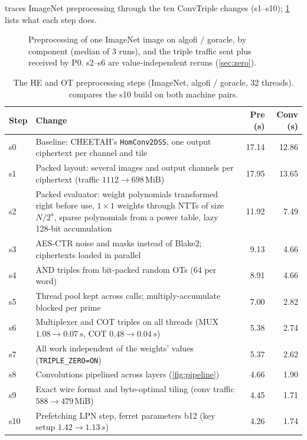 \documentclass[10pt,a4paper]{article}
\newcommand{\flag}[1]{\nolinkurl{#1}}
\newcommand{\s}{\,s\xspace}
\begin{document}
 traces ImageNet preprocessing through the ten ConvTriple changes (s1--s10); \cref{tab:steps} lists what each step does.

\begin{figure}[t]
  \centering
  \caption{Preprocessing of one ImageNet image on algofi / goracle, by component (median of 3 runs), and
  the triple traffic sent plus received by P0. s2--s6 are value-independent reruns (\cref{sec:zero}).}
  \label{fig:steps}
\end{figure}

\begin{table}[t]
\centering\small
\begin{tabularx}{\linewidth}{@{}lXrr@{}}
\toprule
Step & Change & Pre (s) & Conv (s)\\
\midrule
s0 & Baseline: CHEETAH's \texttt{HomConv2DSS}, one output ciphertext per channel and tile & 17.14 & 12.86\\
s1 & Packed layout: several images and output channels per ciphertext (traffic $1112\to698$\,MiB) & 17.95 & 13.65\\
s2 & Packed evaluator: weight polynomials transformed right before use, $1\times1$ weights through NTTs of size $N/2^a$, sparse polynomials from a power table, lazy 128-bit accumulation & 11.92 & 7.49\\
s3 & AES-CTR noise and masks instead of Blake2; ciphertexts loaded in parallel & 9.13 & 4.66\\
s4 & AND triples from bit-packed random OTs (64 per word) & 8.91 & 4.66\\
s5 & Thread pool kept across calls; multiply-accumulate blocked per prime & 7.00 & 2.82\\
s6 & Multiplexer and COT triples on all threads (MUX $1.08\to0.07\s$, COT $0.48\to0.04\s$) & 5.38 & 2.74\\
s7 & All work independent of the weights' values (\flag{TRIPLE_ZERO=ON}) & 5.37 & 2.62\\
s8 & Convolutions pipelined across layers (\cref{fig:pipeline}) & 4.66 & 1.90\\
s9 & Exact wire format and byte-optimal tiling (conv traffic $588\to479$\,MiB) & 4.45 & 1.71\\
s10 & Prefetching LPN step, ferret parameters b12 (key setup $1.42\to1.13\s$) & 4.26 & 1.74\\
\bottomrule
\end{tabularx}
\caption{The HE and OT preprocessing steps (ImageNet, algofi / goracle, 32 threads).  compares the s10 build
on both machine pairs.}
\label{tab:steps}
\end{table}
\end{document}
